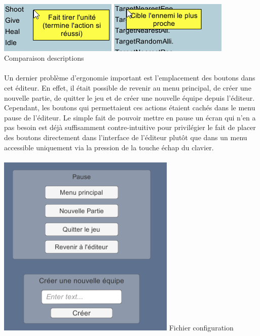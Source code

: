 \documentclass{report}
\begin{document}
\paragraph{}
\begin{center}
\includegraphics[scale=1]{DATA/terminale1.png}
\includegraphics[scale=1]{DATA/terminale2.png}
 {Comparaison descriptions}
\end{center}
\paragraph{}
    Un dernier problème d’ergonomie important est l’emplacement des boutons dans cet éditeur. En effet, il était possible de revenir au menu principal, de créer une nouvelle partie, de quitter le jeu et de créer une nouvelle équipe depuis l’éditeur. Cependant, les boutons qui permettaient ces actions étaient cachés dans le menu pause de l’éditeur. Le simple fait de pouvoir mettre en pause un écran qui n’en a pas besoin est déjà suffisamment contre-intuitive pour privilégier le fait de placer des boutons directement dans l’interface de l’éditeur plutôt que dans un menu accessible uniquement via la pression de la touche échap du clavier.
\paragraph{}
\begin{center}
\includegraphics[scale=1]{DATA/oldPause.png}
 {Fichier configuration}
\end{center}
\end{document}
